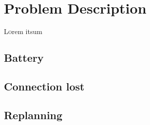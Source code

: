 \chapter{Problem Description}
\label{ch:ProblemDescription}
\lettrine[lraise=-0.1, lines=2, loversize=0.2]{L}{o}rem itsum




\section{Battery}
\label{sec:Battery}

\section{Connection lost}
\label{sec:ConnectionLost}

\section{Replanning}
\label{sec:Replanning}

